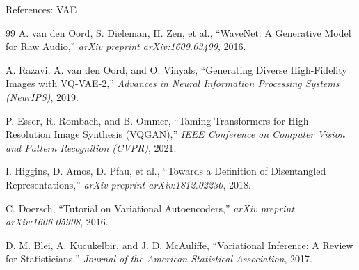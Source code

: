 \begin{frame}[allowframebreaks]{References: VAE}
\begin{thebibliography}{99}
        A. van den Oord, S. Dieleman, H. Zen, et al.,
        \newblock ``WaveNet: A Generative Model for Raw Audio,''
        \newblock \emph{arXiv preprint arXiv:1609.03499}, 2016.

        A. Razavi, A. van den Oord, and O. Vinyals,
        \newblock ``Generating Diverse High-Fidelity Images with VQ-VAE-2,''
        \newblock \emph{Advances in Neural Information Processing Systems (NeurIPS)}, 2019.

        P. Esser, R. Rombach, and B. Ommer,
        \newblock ``Taming Transformers for High-Resolution Image Synthesis (VQGAN),''
        \newblock \emph{IEEE Conference on Computer Vision and Pattern Recognition (CVPR)}, 2021.

        I. Higgins, D. Amos, D. Pfau, et al.,
        \newblock ``Towards a Definition of Disentangled Representations,''
        \newblock \emph{arXiv preprint arXiv:1812.02230}, 2018.

        C. Doersch,
        \newblock ``Tutorial on Variational Autoencoders,''
        \newblock \emph{arXiv preprint arXiv:1606.05908}, 2016.

        D. M. Blei, A. Kucukelbir, and J. D. McAuliffe,
        \newblock ``Variational Inference: A Review for Statisticians,''
        \newblock \emph{Journal of the American Statistical Association}, 2017.
    \end{thebibliography}
\end{frame}
